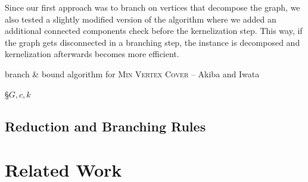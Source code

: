 \documentclass[]{article}
\begin{document}
Since our first approach was to branch on vertices that decompose the graph, we also tested a slightly modified version of the algorithm where we added an additional connected components check before the kernelization step. This way, if the graph gets disconnected in a branching step, the instance is decomposed and kernelization afterwards becomes more efficient.

\begin{algorithm}
	\caption{branch \& bound algorithm for \textsc{Min Vertex Cover} -- Akiba and Iwata \cite{akiba_iwata}}\label{alg:bb}
	\DontPrintSemicolon
	
	\S{$G,c,k$}
	
		
\end{algorithm}

\subsection{Reduction and Branching Rules} \label{red}
\newpage
\section{Related Work} \label{sec3}
\end{document}
